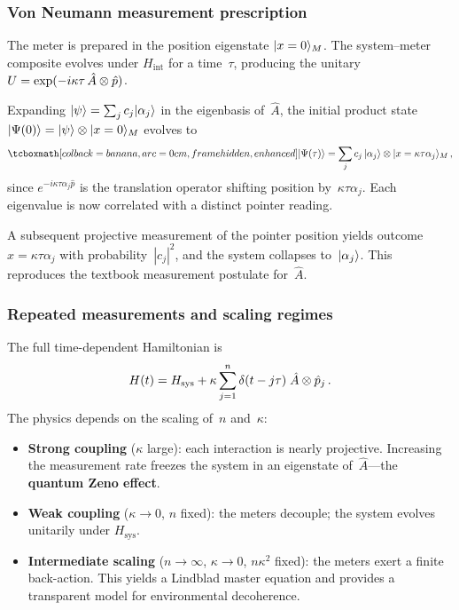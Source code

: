 \subsubsection{Von Neumann measurement prescription}

\begin{definition}%
\label{def:vn-measurement}
  The meter is prepared in the position eigenstate
  $\lvert x = 0 \rangle_{M}$.  The system--meter composite evolves under
  $H_{\mathrm{int}}$ for a time~$\tau$, producing the unitary
  $U = \exp(-i\kappa\tau\, \hat{A} \otimes \hat{p})$.
\end{definition}

Expanding $\lvert \psi \rangle = \sum_j c_j\lvert \alpha_j \rangle$ in the eigenbasis
of~$\hat{A}$, the initial product state
$\lvert \Psi(0) \rangle = \lvert \psi \rangle \otimes \lvert x=0 \rangle_M$ evolves to
\begin{equation}\label{eq:posterior-entangled}
  \eqbox{\ket{\Psi(\tau)}
  = \sum_j c_j\,\ket{\alpha_j}
    \tp \ket{x = \kappa\tau\alpha_j}_M}\,,
\end{equation}
since $e^{-i\kappa\tau\alpha_j\hat{p}}$ is the translation operator
shifting position by~$\kappa\tau\alpha_j$.  Each eigenvalue is now
correlated with a distinct pointer reading.

\begin{keyresult}
  A subsequent projective measurement of the pointer position yields
  outcome $x = \kappa\tau\alpha_j$ with probability~$|c_j|^2$, and
  the system collapses to~$\lvert \alpha_j \rangle$.  This reproduces the
  textbook measurement postulate for~$\hat{A}$.
\end{keyresult}

\subsubsection{Repeated measurements and scaling regimes}

The full time-dependent Hamiltonian is
\begin{equation}\label{eq:repeated-H}
  H(t) = H_{\mathrm{sys}}
  + \kappa \sum_{j=1}^{n}
    \delta(t - j\tau)\;\hat{A} \otimes \hat{p}_j\,.
\end{equation}
The physics depends on the scaling of~$n$ and~$\kappa$:
\begin{itemize}
  \item \textbf{Strong coupling} ($\kappa$ large): each interaction
    is nearly projective.  Increasing the measurement rate freezes the
    system in an eigenstate of~$\hat{A}$---the \textbf{quantum Zeno
    effect}.
  \item \textbf{Weak coupling} ($\kappa \to 0$, $n$ fixed): the
    meters decouple; the system evolves unitarily under
    $H_{\mathrm{sys}}$.
  \item \textbf{Intermediate scaling} ($n \to \infty$,
    $\kappa \to 0$, $n\kappa^2$ fixed): the meters exert a finite
    back-action.  This yields a Lindblad master equation and provides
    a transparent model for environmental decoherence.
\end{itemize}

